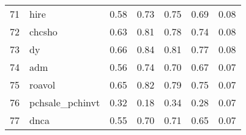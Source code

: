 \documentclass[12pt]{article}
\begin{document}
\begin{footnotesize}
\begin{longtable}{rl|c|c|c|c|c}
71  & hire             & 0.58                                                                                      & 0.73                                                                                        & 0.75                                                                                         & 0.69 & 0.08               \\
72  & chcsho           & 0.63                                                                                      & 0.81                                                                                        & 0.78                                                                                         & 0.74 & 0.08               \\
73  & dy               & 0.66                                                                                      & 0.84                                                                                        & 0.81                                                                                         & 0.77 & 0.08               \\
74  & adm              & 0.56                                                                                      & 0.74                                                                                        & 0.70                                                                                         & 0.67 & 0.07               \\
75  & roavol           & 0.65                                                                                      & 0.82                                                                                        & 0.79                                                                                         & 0.75 & 0.07               \\
76  & pchsale\_pchinvt & 0.32                                                                                      & 0.18                                                                                        & 0.34                                                                                         & 0.28 & 0.07               \\
77  & dnca             & 0.55                                                                                      & 0.70                                                                                        & 0.71                                                                                         & 0.65 & 0.07               \\

\end{longtable}
\end{footnotesize}
\end{document}
